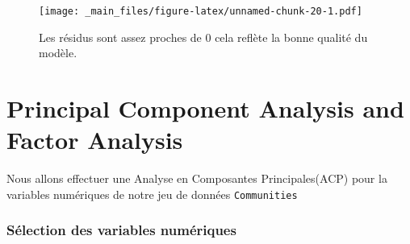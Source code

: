 \documentclass[
]{book}
\newenvironment{Shaded}{\begin{snugshade}}{\end{snugshade}}
\newcommand{\AttributeTok}[1]{\textcolor[rgb]{0.77,0.63,0.00}{#1}}
\newcommand{\DecValTok}[1]{\textcolor[rgb]{0.00,0.00,0.81}{#1}}
\newcommand{\FunctionTok}[1]{\textcolor[rgb]{0.00,0.00,0.00}{#1}}
\newcommand{\NormalTok}[1]{#1}
\newcommand{\OtherTok}[1]{\textcolor[rgb]{0.56,0.35,0.01}{#1}}
\newcommand{\SpecialCharTok}[1]{\textcolor[rgb]{0.00,0.00,0.00}{#1}}
\newcommand{\StringTok}[1]{\textcolor[rgb]{0.31,0.60,0.02}{#1}}
\begin{document}
\begin{Shaded}
\end{Shaded}

\begin{figure}
\centering
\texttt{[image: \_main\_files/figure-latex/unnamed-chunk-20-1.pdf]}
\caption{\label{fig:unnamed-chunk-20}Les résidus sont assez proches de 0 cela reflète la bonne qualité du modèle.}
\end{figure}

\hypertarget{principal-component-analysis-and-factor-analysis}{%
\chapter{Principal Component Analysis and Factor Analysis}\label{principal-component-analysis-and-factor-analysis}}

Nous allons effectuer une Analyse en Composantes Principales(ACP) pour la variables numériques de notre jeu de données \texttt{Communities}

\hypertarget{suxe9lection-des-variables-numuxe9riques}{%
\subsection*{Sélection des variables numériques}\label{suxe9lection-des-variables-numuxe9riques}}
\end{document}

